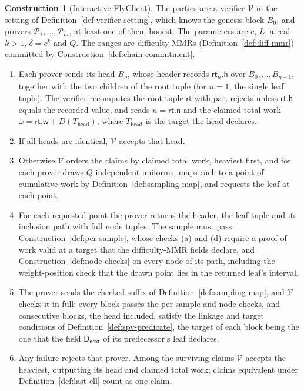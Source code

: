 \documentclass[11pt,a4paper]{article}
\theoremstyle{definition}
\newtheorem{construction}[theorem]{Construction}
\newcommand{\Prov}{\mathcal{P}}
\newcommand{\Ver}{\mathcal{V}}
\begin{document}
\begin{construction}[Interactive FlyClient]\label{def:interactive}
The parties are a verifier $\Ver$ in the setting of
Definition~\ref{def:verifier-setting}, which knows the genesis block $B_0$,
and provers $\Prov_1,\dots,\Prov_m$, at least one of them honest. The
parameters are $c$, $L$, a real $k>1$, $\delta=c^k$ and $Q$. The
ranges are difficulty MMRs (Definition~\ref{def:diff-mmr}) committed by
Construction~\ref{def:chain-commitment}.
\begin{enumerate}
\item Each prover sends its head $B_\eta$, whose header records
  $\mathsf{rt}_n.\mathsf{h}$ over $B_0,\dots,B_{\eta-1}$, together with the two
  children of the root tuple (for $n=1$, the single leaf tuple). The
  verifier recomputes the root tuple $\mathsf{rt}$ with $\mathrm{par}$,
  rejects unless $\mathsf{rt}.\mathsf{h}$ equals the recorded value, and
  reads $n=\mathsf{rt}.\mathsf{n}$ and the claimed total work
  $\omega=\mathsf{rt}.\mathsf{w}+D(T_{\mathrm{head}})$, where
  $T_{\mathrm{head}}$ is the target the head declares.
\item If all heads are identical, $\Ver$ accepts that head.
\item Otherwise $\Ver$ orders the claims by claimed total work, heaviest
  first, and for each prover draws $Q$ independent uniforms, maps each to a
  point of cumulative work by Definition~\ref{def:sampling-map}, and
  requests the leaf at each point.
\item For each requested point the prover returns the header, the leaf
  tuple and its inclusion path with full node tuples. The sample must pass
  Construction~\ref{def:per-sample}, whose checks (a) and (d) require a
  proof of work valid at a target that the difficulty-MMR fields declare,
  and Construction~\ref{def:node-checks} on every node of its path,
  including the weight-position check that the drawn point lies in the
  returned leaf's interval.
\item The prover sends the checked suffix of
  Definition~\ref{def:sampling-map}, and $\Ver$ checks it in full: every
  block passes the per-sample and node checks, and consecutive blocks,
  the head included, satisfy the linkage and target conditions of
  Definition~\ref{def:spv-predicate}, the target of each block being the
  one that the field $\mathsf{D}_{\mathsf{next}}$ of its predecessor's leaf
  declares.
\item Any failure rejects that prover. Among the surviving claims $\Ver$
  accepts the heaviest, outputting its head and claimed total work; claims
  equivalent under Definition~\ref{def:last-ell} count as one claim.
\end{enumerate}
\end{construction}
\end{document}
